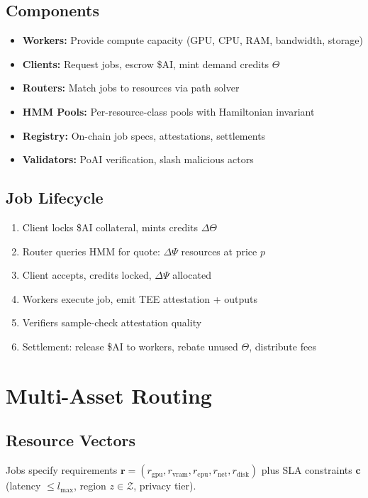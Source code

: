 \documentclass[11pt]{article}
\begin{document}
\subsection{Components}
\begin{itemize}[leftmargin=1.1em]
  \item \textbf{Workers:} Provide compute capacity (GPU, CPU, RAM, bandwidth, storage)
  \item \textbf{Clients:} Request jobs, escrow \$AI, mint demand credits \(\Theta\)
  \item \textbf{Routers:} Match jobs to resources via path solver
  \item \textbf{HMM Pools:} Per-resource-class pools with Hamiltonian invariant
  \item \textbf{Registry:} On-chain job specs, attestations, settlements
  \item \textbf{Validators:} PoAI verification, slash malicious actors
\end{itemize}

\subsection{Job Lifecycle}
\begin{enumerate}
  \item Client locks \$AI collateral, mints credits \(\Delta\Theta\)
  \item Router queries HMM for quote: \(\Delta\Psi\) resources at price \(p\)
  \item Client accepts, credits locked, \(\Delta\Psi\) allocated
  \item Workers execute job, emit TEE attestation + outputs
  \item Verifiers sample-check attestation quality
  \item Settlement: release \$AI to workers, rebate unused \(\Theta\), distribute fees
\end{enumerate}

\section{Multi-Asset Routing}
\subsection{Resource Vectors}
Jobs specify requirements \(\bm{r} = (r_{\text{gpu}}, r_{\text{vram}}, r_{\text{cpu}}, r_{\text{net}}, r_{\text{disk}})\) plus SLA constraints \(\bm{c}\) (latency \(\le l_{\max}\), region \(z \in \mathcal{Z}\), privacy tier).
\end{document}
